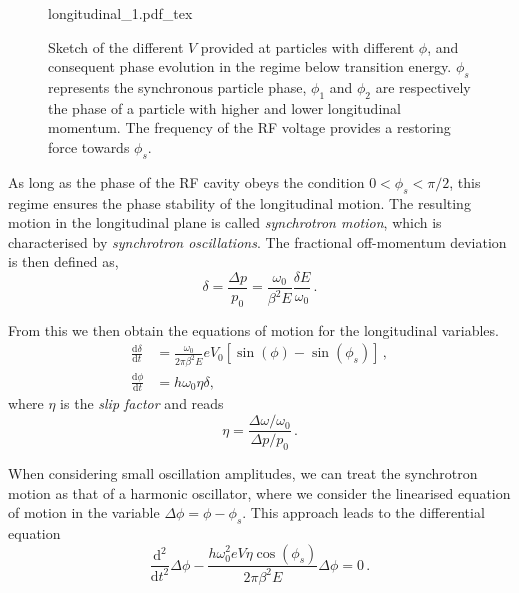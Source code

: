 \begin{figure}
    \centering
    \def\svgwidth{0.85\columnwidth}
    {longitudinal_1.pdf_tex}
    \caption{Sketch of the different $V$ provided at particles with different $\phi$, and consequent phase evolution in the regime below transition energy. $\phi_s$ represents the synchronous particle phase, $\phi_1$ and $\phi_2$ are respectively the phase of a particle with higher and lower longitudinal momentum. The frequency of the RF voltage provides a restoring force towards $\phi_s$.}
    \label{fig:long_1}
\end{figure}

As long as the phase of the RF cavity obeys the condition $0<\phi_s<\pi / 2$, this regime ensures the phase stability of the longitudinal motion. The resulting motion in the longitudinal plane is called \textit{synchrotron motion}, which is characterised by \textit{synchrotron oscillations}. The fractional off-momentum deviation is then defined as,
\begin{equation}
    \delta=\frac{\Delta p}{p_0}=\frac{\omega_0}{\beta^2 E} \frac{\delta E}{\omega_0} \,.
\end{equation}

From this we then obtain the equations of motion for the longitudinal variables.
\begin{equation}
    \begin{aligned}
    \frac{\mathrm{d} \delta}{\mathrm{d} t} &=\frac{\omega_0}{2 \pi \beta^2 E} e V_0\left[\sin (\phi)-\sin \left(\phi_s\right)\right] \,, \\
    \frac{\mathrm{d} \phi}{\mathrm{d} t} &=h \omega_0 \eta \delta,
    \end{aligned}
\end{equation}
where $\eta$ is the \textit{slip factor} and reads
\begin{equation}
    \eta=\frac{\Delta \omega / \omega_0}{\Delta p / p_0} \,.
\end{equation}

When considering small oscillation amplitudes, we can treat the synchrotron motion as that of a harmonic oscillator, where we consider the linearised equation of motion in the variable $\Delta \phi=\phi-\phi_s$. This approach leads to the differential equation
\begin{equation}
    \frac{\mathrm{d}^2}{\mathrm{d} t^2} \Delta \phi-\frac{h \omega_0^2 e V \eta \cos \left(\phi_s\right)}{2 \pi \beta^2 E} \Delta \phi=0 \,.
\end{equation}

